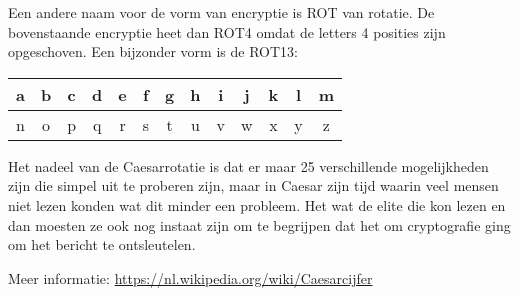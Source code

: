 Een andere naam voor de vorm van encryptie is ROT van rotatie. De bovenstaande encryptie heet dan ROT4 omdat de letters 4 posities zijn opgeschoven. Een bijzonder vorm is de ROT13:

\begin{tabular}{ | c | c | c | c | c | c | c | c | c | c | c | c | c | }
	\hline
 a & b & c & d & e & f & g & h & i & j & k & l & m \\
	\hline
 n & o & p & q & r & s & t & u & v & w & x & y & z \\
	\hline
\end{tabular}

Het nadeel van de Caesarrotatie is dat er maar 25 verschillende mogelijkheden zijn die simpel uit te proberen zijn, maar in Caesar zijn tijd waarin veel mensen niet lezen konden wat dit minder een probleem. Het wat de elite die kon lezen en dan moesten ze ook nog instaat zijn om te begrijpen dat het om cryptografie ging om het bericht te ontsleutelen.

Meer informatie: \url{https://nl.wikipedia.org/wiki/Caesarcijfer}
